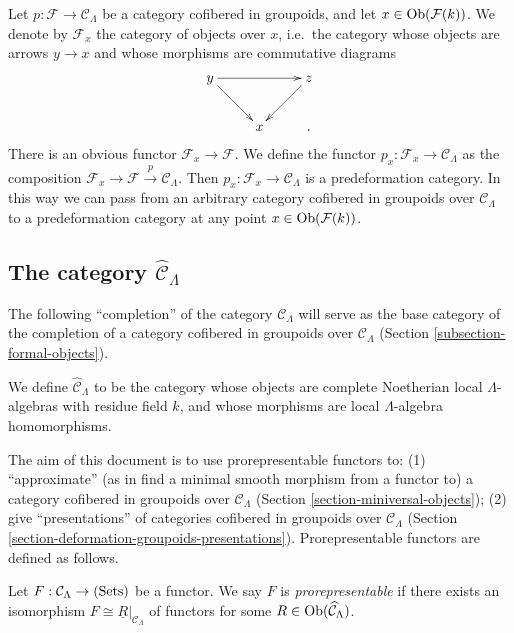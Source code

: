 \begin{remark}
\label{remark-localize-cofibered-groupoid} 
Let $p: \mathcal F \rightarrow \mathcal C_{\Lambda}$ be a category cofibered in 
groupoids, and let $x \in \textnormal{Ob}(\mathcal F(k))$.  We denote by 
$\mathcal F_{x}$ the category of objects over $x$, i.e.\ the category whose 
objects are arrows $y \rightarrow x$ and whose morphisms are commutative 
diagrams
\[
\xymatrix{
y \ar[rr] \ar[dr] &   & z \ar[dl] \\
                 & x &. 
}
\]
There is an obvious functor $\mathcal F_{x} \rightarrow \mathcal F$.  We define 
the functor $p_x: \mathcal F_{x} \rightarrow \mathcal C_{\Lambda}$ as the 
composition $\mathcal F_x \rightarrow \mathcal F \xrightarrow{p} \mathcal 
C_{\Lambda}$. Then $p_x : \mathcal F_x \rightarrow \mathcal C_{\Lambda}$ is a 
predeformation category.  In this way we can pass from an arbitrary category 
cofibered in groupoids over $\mathcal C_{\Lambda}$ to a predeformation category 
at any point $x \in \textnormal{Ob}(\mathcal F(k))$.
\end{remark}

\subsection{The category $\widehat{\mathcal C}_{\Lambda}$}
The following ``completion'' of the category $\mathcal C_{\Lambda}$ will serve 
as the base category of the completion of a category cofibered in groupoids 
over $\mathcal C_{\Lambda}$ (Section \ref{subsection-formal-objects}).

\begin{definition}
We define $\widehat{\mathcal C}_{\Lambda}$ to be the category whose objects are 
complete Noetherian local $\Lambda$-algebras with residue field $k$, and whose 
morphisms are local $\Lambda$-algebra homomorphisms.
\end{definition}

\noindent
The aim of this document is to use prorepresentable functors to: (1) 
``approximate'' (as in find a minimal smooth morphism from a functor to) a 
category cofibered in groupoids over $\mathcal C_{\Lambda}$ (Section 
\ref{section-miniversal-objects}); (2) give ``presentations'' of categories 
cofibered in groupoids over $\mathcal C_{\Lambda}$ (Section 
\ref{section-deformation-groupoids-presentations}).  Prorepresentable functors 
are defined as follows.
\begin{definition}
Let $F: \mathcal C_{\Lambda} \rightarrow \textnormal{(Sets)}$ be a functor.  We 
say $F$ is \emph{prorepresentable} if there exists an isomorphism $F \cong 
\underline{R}|_{\mathcal C_{\Lambda}}$ of functors for some $R \in 
\textnormal{Ob}(\widehat{\mathcal C}_{\Lambda})$.
\end{definition}  

